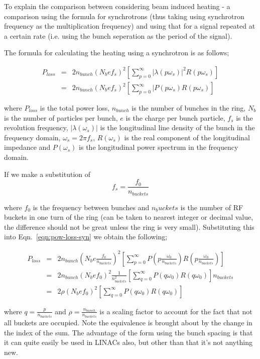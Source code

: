 \documentclass[12pt,a4paper,twopage,openright]{article}
\begin{document}
To explain the comparison between considering beam induced heating - a comparison using the formula for synchrotrons (thus taking using synchrotron frequency as the multiplication frequency) and using that for a signal repeated at a certain rate (i.e. using the bunch seperation as the period of the signal).

The formula for calculating the heating using a synchrotron is as follows;

\begin{eqnarray}
P_{loss} & = & 2n_{bunch} \left(N_{b}ef_{s}  \right)^{2}\left[\displaystyle\sum\limits_{p=0}^\infty |\lambda(p\omega_{s})|^{2}R(p\omega_{s} )   \right] \nonumber \\
& = & 2n_{bunch} \left(N_{b}ef_{s}  \right)^{2}\left[\displaystyle\sum\limits_{p=0}^\infty |P(p\omega_{s})R(p\omega_{s} )   \right]
\label{eqn:pow-loss-syn}
\end{eqnarray}

where $P_{loss}$ is the total power loss, $n_{bunch}$ is the number of bunches in the ring, $N_{b}$ is the number of particles per bunch, $e$ is the charge per bunch particle, $f_{s}$ is the revolution frequency, $|\lambda(\omega_{s})|$ is the longitudinal line density of the bunch in the frequency domain, $\omega_{s} = 2\pi f_{s}$, $R(\omega_{s})$ is the real component of the longitudinal impedance and $P(\omega_{s})$ is the longitudinal power spectrum in the frequency domain.

If we make a substitution of 
\begin{equation}
f_{s} = \frac{f_{0}}{n_{buckets}}
\end{equation}

where $f_{0}$ is the frequency between bunches and $n_buckets$ is the number of RF buckets in one turn of the ring (can be taken to nearest integer or decimal value, the difference should not be great unless the ring is very small). Substituting this into Eqn.~\ref{eqn:pow-loss-syn} we obtain the following;

\begin{eqnarray}
P_{loss} & = & 2n_{bunch}\left(N_{b}e\frac{f_{0}}{n_{buckets}}    \right)^{2} \left[\displaystyle\sum\limits_{p=0}^\infty P\left(p\frac{\omega_{0}}{n_{buckets}}\right)R\left(p\frac{\omega_{0}}{n_{buckets}} \right)   \right]  \nonumber \\
& = & 2n_{bunch}\left(N_{b}ef_{0}\right)^{2} \frac{1}{n_{buckets}^{2}} \left[\displaystyle\sum\limits_{q=0}^\infty P(q\omega_{0})R(q\omega_{0} )   \right] n_{buckets} \nonumber \\
& = & 2\rho \left(N_{b}ef_{0}  \right)^{2} \left[\displaystyle\sum\limits_{q=0}^\infty P(q\omega_{0})R(q\omega_{0} )   \right]
\end{eqnarray}

where $q = \frac{p}{n_{buckets}}$ and $\rho = \frac{n_{bunch}}{n_{buckets}}$ is a scaling factor to account for the fact that not all buckets are occupied. Note the equivalence is brought about by the change in the index of the sum. The advantage of the form using the bunch spacing is that it can quite easily be used in LINACs also, but other than that it's not anything new.
\end{document}
